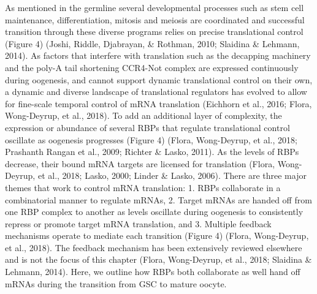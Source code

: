 \documentclass[12pt,oneside]{reedthesis}
\begin{document}
As mentioned in the germline several developmental processes such as
stem cell maintenance, differentiation, mitosis and meiosis are
coordinated and successful transition through these diverse programs
relies on precise translational control (Figure 4) (Joshi, Riddle, Djabrayan, \& Rothman, 2010; Slaidina \& Lehmann, 2014). As factors that interfere with translation such as
the decapping machinery and the poly-A tail shortening CCR4-Not complex
are expressed continuously during oogenesis, and cannot support dynamic
translational control on their own, a dynamic and diverse landscape of
translational regulators has evolved to allow for fine-scale temporal
control of mRNA translation (Eichhorn et al., 2016; Flora, Wong-Deyrup, et al., 2018). To add an
additional layer of complexity, the expression or abundance of several
RBPs that regulate translational control oscillate as oogenesis
progresses (Figure 4) (Flora, Wong-Deyrup, et al., 2018; Prashanth Rangan et al., 2009; Richter \& Lasko, 2011). As
the levels of RBPs decrease, their bound mRNA targets are licensed for
translation (Flora, Wong-Deyrup, et al., 2018; Lasko, 2000; Linder \& Lasko, 2006). There are three
major themes that work to control mRNA translation: 1. RBPs collaborate
in a combinatorial manner to regulate mRNAs, 2. Target mRNAs are handed
off from one RBP complex to another as levels oscillate during oogenesis
to consistently repress or promote target mRNA translation, and 3.
Multiple feedback mechanisms operate to mediate each transition (Figure
4) (Flora, Wong-Deyrup, et al., 2018). The feedback mechanism has been extensively
reviewed elsewhere and is not the focus of this chapter (Flora, Wong-Deyrup, et al., 2018; Slaidina \& Lehmann, 2014). Here, we outline how RBPs both collaborate as well
hand off mRNAs during the transition from GSC to mature oocyte.
\end{document}
